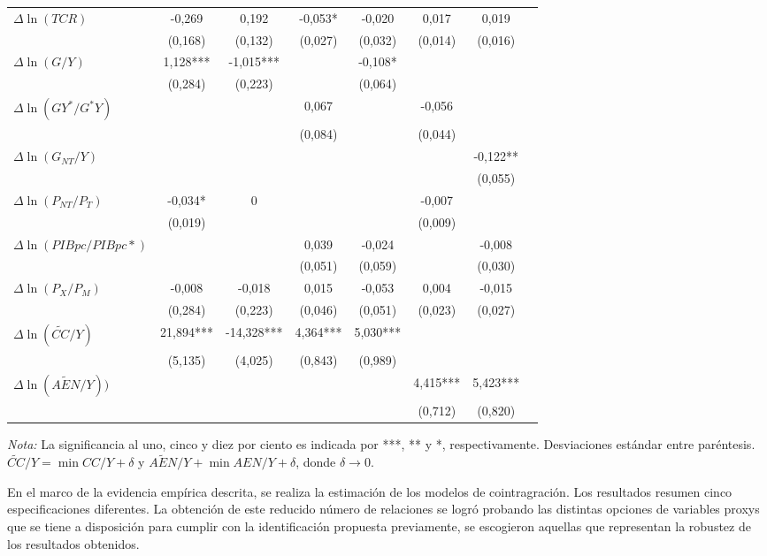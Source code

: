 \documentclass[12pt,letterpaper]{article}
\begin{document}
\begin{table}
\begin{center}
{\begin{tabular}{lccccccc}
\hline													
$\Delta \ln (T	CR)$				&-0,269 		&	0,192		&	-0,053*	&	-0,020		&	0,017	&	0,019	\\
										&	(0,168)		&	(0,132)		&	(0,027)		&	(0,032)		&(0,014)	&(0,016)	\\
$\Delta \ln (G/Y)$				&1,128***		&-1,015***	&					&	-0,108*		&				&			\\
										&	(0,284)		&	(0,223)		&					&	(0,064)		&				&			\\
$\Delta\ln(GY^*/G^*Y)$		&					&					&	0,067		&					&	-0,056	&			\\
										&					&					&	(0,084)		&					&(0,044)	&			\\
$\Delta\ln(G_{NT}/Y)$		&					&					&					&					&				&-0,122**	\\
										&					&					&					&					&				&(0,055)	\\
$\Delta\ln(P_{NT}/P_T)$	&	-0,034*	&	0				&					&					&	-0,007	&			\\
										&(0,019)		&					&					&					&	(0,009)	&			\\
$\Delta\ln(PIBpc/PIBpc*)$	&					&					&	0,039		&	-0,024		&				&-0,008		\\
										&					&					&	(0,051)		&	(0,059)		&				&(0,030)	\\
$\Delta\ln(P_X/P_M)$		&-0,008		&-0,018		&	0,015		&	-0,053		&	0,004	&-0,015		\\
										&	(0,284)		&(0,223)		&	(0,046)		&	(0,051)		&(0,023)	&(0,027)	\\
$\Delta\ln(\tilde{CC}/Y)$	&21,894***	&-14,328***	&4,364***	&5,030***	&				&			\\
										&(5,135)		&	(4,025)		&	(0,843)		&	(0,989)		&				&			\\
$\Delta\ln(\tilde{AEN}/Y))$&					&					&					&					&4,415***	&5,423***	\\
										&					&					&					&					&(0,712)	&(0,820)	\\
\hline													
\hline													
\end{tabular}%
}	
\end{center}
\begin{scriptsize}
\emph{Nota:} La significancia al uno, cinco y diez por ciento es indicada por ***, ** y *, respectivamente. Desviaciones estándar entre paréntesis. $\tilde{CC}/Y = \min CC/Y + \delta$ y $\tilde{AEN}/Y + \min AEN/Y + \delta $, donde $\delta \rightarrow 0$.
\end{scriptsize}						
\label{beercoi}		
\end{table}	

En el marco de la evidencia empírica descrita, se realiza la estimación de los modelos de cointragración. Los resultados resumen cinco especificaciones diferentes. La obtención de este reducido número de relaciones se logró probando las distintas opciones de variables proxys que se tiene a disposición para cumplir con la identificación propuesta previamente, se escogieron aquellas que representan la robustez de los resultados obtenidos.
\end{document}
